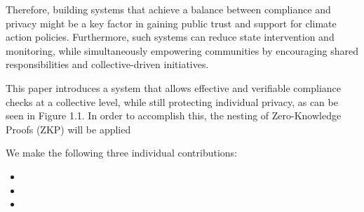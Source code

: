 Therefore, building systems that achieve a balance between compliance and privacy might be a key factor in gaining public trust and support for climate action policies. Furthermore, such systems can reduce state intervention and monitoring, while simultaneously empowering communities by encouraging shared responsibilities and collective-driven initiatives. 

This paper introduces a system that allows effective and verifiable compliance checks at a collective level, while still protecting individual privacy, as can be seen in Figure 1.1. In order to accomplish this, the nesting of Zero-Knowledge Proofs (ZKP) will be applied

We make the following three individual contributions:
\begin{itemize}
    \item
    \item
    \item
\end{itemize}

